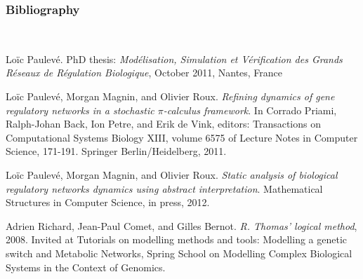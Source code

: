 
\begin{frame}[c]
  \frametitle{Bibliography}

\footnotesize
\setlength{\parindent}{-1em}
\setlength{\parskip}{0.5em}
~

\vfill
{} Loïc Paulevé. PhD thesis: \textit{Modélisation, Simulation et Vérification des Grands Réseaux de Régulation Biologique}, October 2011, Nantes, France


 Loïc Paulevé, Morgan Magnin, and Olivier Roux. \textit{Refining dynamics of gene regulatory networks in a stochastic $\pi$-calculus framework}. In Corrado Priami, Ralph-Johan Back, Ion Petre, and Erik de Vink, editors: Transactions on Computational Systems Biology XIII, volume 6575 of Lecture Notes in Computer Science, 171-191. Springer Berlin/Heidelberg, 2011.

 Loïc Paulevé, Morgan Magnin, and Olivier Roux. \textit{Static analysis of biological regulatory networks dynamics using abstract interpretation}. Mathematical Structures in Computer Science, in press, 2012.


 Adrien Richard, Jean-Paul Comet, and Gilles Bernot. \textit{R. Thomas' logical method}, 2008. Invited at Tutorials on modelling methods and tools: Modelling a genetic switch and Metabolic Networks, Spring School on Modelling Complex Biological Systems in the Context of Genomics.


\vfill
\Large
\begin{flushright}
  \hspace{1cm}~
\end{flushright}
\vfill

~

\end{frame}
